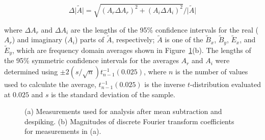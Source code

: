 \documentclass[draft,linenumbers]{agujournal2018}
\begin{document}
\begin{equation}
\Delta\big|\widetilde{A}\big| = \sqrt{(A_r\Delta A_r)^2 + (A_i\Delta A_i)^2} / \big|\widetilde{A}\big|
\end{equation}

\noindent
where $\Delta A_r$ and $\Delta A_i$ are the lengths of the 95\% confidence intervals for the real ($A_r$) and imaginary ($A_i$) parts of $\widetilde{A}$, respectively; $\widetilde{A}$ is one of the $\widetilde{B}_x$, $\widetilde{B}_y$, $\widetilde{E}_x$, and $\widetilde{E}_y$, which are frequency domain averages shown in Figure~\ref{fig:timeseries}(b). The lengths of the 95\% symmetric confidence intervals for the averages $A_r$ and $A_i$ were determined using $\pm 2 (s/\sqrt{n})t^{-1}_{n-1}(0.025)$, where $n$ is the number of values used to calculate the average, $t^{-1}_{n-1}(0.025)$ is the inverse $t$-distribution evaluated at $0.025$ and $s$ is the standard deviation of the sample.

\begin{figure}
     \hspace{10pt}
     \caption{(a) Measurements used for analysis after mean subtraction and despiking. (b) Magnitudes of discrete Fourier transform coefficients for measurements in (a).}
  \label{fig:timeseries}
\end{figure}
\end{document}
